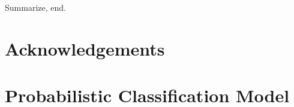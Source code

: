 \documentclass[useAMS,usenatbib,a4paper]{mn2e}
\begin{document}
Summarize, end.


\section*{Acknowledgements}
 



\appendix


\section{Probabilistic Classification Model}
\label{appendix:probmodel}




% 






\label{lastpage}
\bsp
\end{document}
